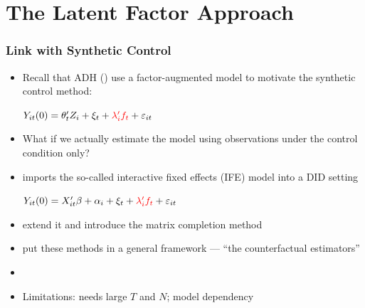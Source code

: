 \documentclass[xcolor=svgnames,9pt,english,t, aspectratio=169]{beamer}
\begin{document}


\section{The Latent Factor Approach}

\begin{frame}
\frametitle{Link with Synthetic Control}
\begin{itemize}\itemsep0.5em 
\item Recall that ADH (\citeyear{abadie2010synthetic}) use a factor-augmented model to motivate the synthetic control method: 
\begin{center}
$Y_{it}(0) = \theta_{t}'Z_{i} + \xi_{t} + \textcolor{red}{\lambda_{i}'f_{t}} + \varepsilon_{it}$
\end{center}\pause
\item What if we actually estimate the model using observations under the control condition only? \pause 
\item {} imports the so-called interactive fixed effects (IFE) model into a DID setting
\begin{center}
$Y_{it}(0) = X_{it}'\beta + \alpha_{i} + \xi_{t} + \textcolor{red}{\lambda_{i}'f_{t}} + \varepsilon_{it}$
\end{center}\pause
\item {} extend it and introduce the matrix completion method
\item {} put these methods in a general framework --- ``the counterfactual estimators'' \pause
\item {}\pause
\item Limitations: needs large $T$ and $N$; model dependency
\end{itemize}
\end{frame}
\end{document}
